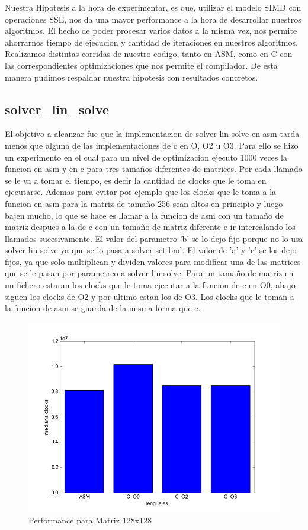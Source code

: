 \graphicspath{{./img/}}

Nuestra Hipotesis a la hora de experimentar, es que, utilizar el modelo SIMD con operaciones SSE, nos da una mayor performance a la hora de desarrollar nuestros algoritmos. El hecho de poder procesar varios datos a la misma vez, nos permite ahorrarnos tiempo de ejecucion y cantidad de iteraciones en nuestros algoritmos.
Realizamos distintas corridas de nuestro codigo, tanto en ASM, como en C con las correspondientes optimizaciones que nos permite el compilador. De esta manera pudimos respaldar nuestra hipotesis con resultados concretos.

\subsection{solver\_lin\_solve}

El objetivo a alcanzar fue que la implementacion de solver$\_$lin$\_$solve en asm tarda menos que alguna de las implementaciones de c en O, O2 u O3. Para ello se hizo un experimento en el cual para un nivel de optimizacion ejecuto 1000 veces la funcion en asm y en c para tres tamaños diferentes de matrices. Por cada llamado se le va a tomar el tiempo, es decir la cantidad de clocks que le toma en ejecutarse. Ademas para evitar por ejemplo que los clocks que le toma a la funcion en asm para la matriz de tamaño 256 sean altos en principio y luego bajen mucho, lo que se hace es llamar a la funcion de asm con un tamaño de matriz despues a la de c con un tamaño de matriz diferente e ir intercalando los llamados sucesivamente. 
El valor del parametro 'b' se lo dejo fijo porque no lo usa solver$\_$lin$\_$solve ya que se lo pasa a solver$\_$set$\_$bnd. El valor de 'a' y 'c' se los dejo fijos, ya que solo multiplican y dividen valores para modificar una de las matrices que se le pasan por parametreo a solver$\_$lin$\_$solve.
Para un tamaño de matriz en un fichero estaran los clocks que le toma ejecutar a la funcion de c en O0, abajo siguen los clocks de O2 y por ultimo estan los de O3. Los clocks que le toman a la funcion de asm se guarda de la misma forma que c.
  

\begin{figure}[h]
  \centering
  	\includegraphics[width=.6\linewidth]{Matriz_128.png}
  	\caption{Performance para Matriz 128x128}
  	\label{fig:M128}
\end{figure}

